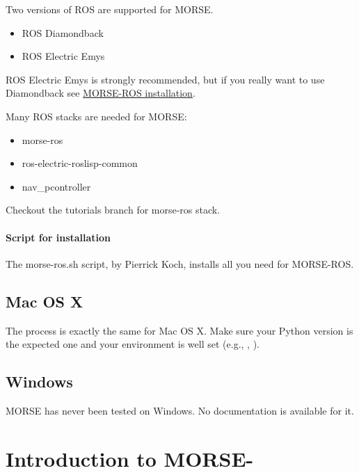 Two versions of ROS are supported for MORSE.
\begin{itemize}
\item ROS Diamondback
\item ROS Electric Emys
\end{itemize}

ROS Electric Emys is strongly recommended, but if you really want to use
Diamondback see
\href{http://www.openrobots.org/morse/doc/latest/user/installation/mw/ros.html}
{MORSE-ROS installation}.

Many ROS stacks are needed for MORSE:
\begin{itemize}
\item {}
  {morse-ros}
\item ros-electric-roslisp-common
\item {}
  {nav\_pcontroller}
\end{itemize}

Checkout the tutorials branch for morse-ros stack.

\paragraph{Script for installation}
The 
{morse-ros.sh} script, by Pierrick Koch, installs all you need for
MORSE-ROS.


\subsection{Mac OS X}

The process is exactly the same for Mac OS X. Make sure your Python version
is the expected one and your environment is well set (e.g.,
, ).

\subsection{Windows}

MORSE has never been tested on Windows. No documentation is available for it.

\section{Introduction to MORSE-\urbi}

